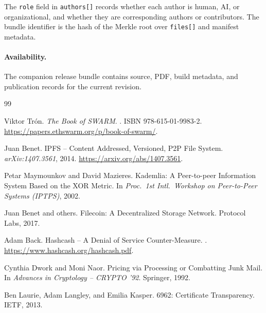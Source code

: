 \documentclass[11pt]{article}
\begin{document}
The \texttt{role} field in \texttt{authors[]} records whether each
author is human, AI, or organizational, and whether they are
corresponding authors or contributors.
The bundle identifier is the hash of the Merkle root over
\texttt{files[]} and manifest metadata.

\paragraph{Availability.}
The companion release bundle contains source, PDF, build metadata, and publication records for the current revision.


\begin{thebibliography}{99}

Viktor Tr\'on.
\newblock \emph{The Book of {SWARM}}.
.
\newblock ISBN 978-615-01-9983-2.
\newblock \url{https://papers.ethswarm.org/p/book-of-swarm/}.

Juan Benet.
\newblock IPFS -- Content Addressed, Versioned, {P2P} File System.
\newblock \emph{arXiv:1407.3561}, 2014.
\newblock \url{https://arxiv.org/abs/1407.3561}.

Petar Maymounkov and David Mazieres.
\newblock Kademlia: A Peer-to-peer Information System Based on the XOR Metric.
\newblock In \emph{Proc.\ 1st Intl.\ Workshop on Peer-to-Peer Systems
  (IPTPS)}, 2002.

Juan Benet and others.
\newblock Filecoin: A Decentralized Storage Network.
\newblock Protocol Labs, 2017.

Adam Back.
\newblock Hashcash -- A Denial of Service Counter-Measure.
.
\newblock \url{https://www.hashcash.org/hashcash.pdf}.

Cynthia Dwork and Moni Naor.
\newblock Pricing via Processing or Combatting Junk Mail.
\newblock In \emph{Advances in Cryptology -- {CRYPTO} '92}. Springer, 1992.

Ben Laurie, Adam Langley, and Emilia Kasper.
 6962: Certificate Transparency.
\newblock IETF, 2013.

\end{thebibliography}
\end{document}
